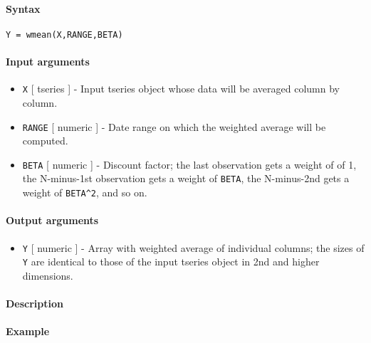 


	\paragraph{Syntax}\label{syntax}

\begin{verbatim}
Y = wmean(X,RANGE,BETA)
\end{verbatim}

\paragraph{Input arguments}\label{input-arguments}

\begin{itemize}
\item
  \texttt{X} {[} tseries {]} - Input tseries object whose data will be
  averaged column by column.
\item
  \texttt{RANGE} {[} numeric {]} - Date range on which the weighted
  average will be computed.
\item
  \texttt{BETA} {[} numeric {]} - Discount factor; the last observation
  gets a weight of of 1, the N-minus-1st observation gets a weight of
  \texttt{BETA}, the N-minus-2nd gets a weight of \texttt{BETA\^{}2},
  and so on.
\end{itemize}

\paragraph{Output arguments}\label{output-arguments}

\begin{itemize}
\itemsep1pt\parskip0pt
\item
  \texttt{Y} {[} numeric {]} - Array with weighted average of individual
  columns; the sizes of \texttt{Y} are identical to those of the input
  tseries object in 2nd and higher dimensions.
\end{itemize}

\paragraph{Description}\label{description}

\paragraph{Example}\label{example}


